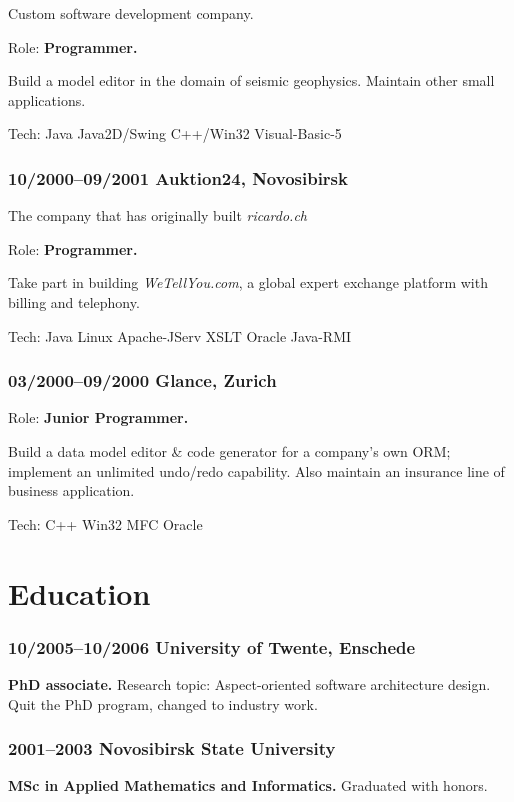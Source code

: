 \documentclass[a4paper, twocolumn, 10pt]{article}
\begin{document}
Custom software development company.

Role: \textbf{Programmer.}

Build a model editor in the domain of seismic geophysics. Maintain other small applications.

Tech: Java Java2D/Swing C++/Win32 Visual-Basic-5

\subsubsection*{10/2000--09/2001 Auktion24, Novosibirsk}

The company that has originally built \emph{ricardo.ch}

Role: \textbf{Programmer.}

Take part in building \emph{WeTellYou.com}, a global expert exchange platform with billing and telephony.

Tech: Java Linux Apache-JServ XSLT Oracle Java-RMI

\subsubsection*{03/2000--09/2000 Glance, Zurich}

Role: \textbf{Junior Programmer.}

Build a data model editor \& code generator for a company's own ORM; implement an unlimited
undo/redo capability. Also maintain an insurance line of business application.

Tech: C++ Win32 MFC Oracle

\section*{Education}

\subsubsection*{10/2005--10/2006 University of Twente, Enschede}

\textbf{PhD associate.} Research topic: Aspect-oriented software architecture design. Quit the PhD
program, changed to industry work.

\subsubsection*{2001--2003 Novosibirsk State University}

\textbf{MSc in Applied Mathematics and Informatics.} Graduated with honors.
\end{document}
